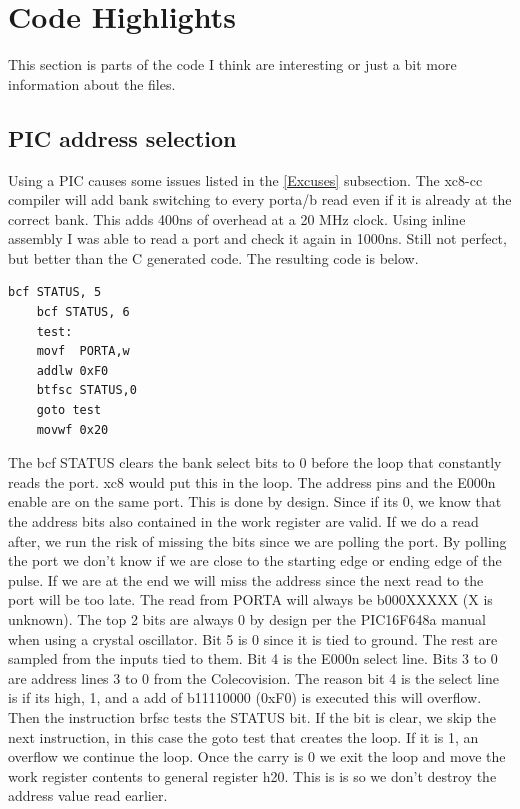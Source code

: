 \documentclass{article}
\begin{document}
  \newpage

  \section{Code Highlights}

  \par
  This section is parts of the code I think are interesting or just a bit more information about the files.

  \subsection{PIC address selection} \label{PIC address selection}

  \par
  Using a PIC causes some issues listed in the \ref{Excuses} subsection. The xc8-cc compiler will add bank switching to every porta/b read even if
  it is already at the correct bank. This adds 400ns of overhead at a 20 MHz clock. Using inline assembly I was able to read a port and check it again
  in 1000ns. Still not perfect, but better than the C generated code. The resulting code is below.

  \begin{lstlisting}[language={[xc8]Assembler}]
    bcf STATUS, 5
    bcf STATUS, 6
    test:
    movf  PORTA,w
    addlw 0xF0
    btfsc STATUS,0
    goto test
    movwf 0x20
  \end{lstlisting}

  \par
  The bcf STATUS clears the bank select bits to 0 before the loop that constantly reads the port. xc8 would put this in the loop.
  The address pins and the E000n enable are on the same port. This is done by design. Since if its 0, we know that the address bits
  also contained in the work register are valid. If we do a read after, we run the risk of missing the bits since we are polling the port.
  By polling the port we don't know if we are close to the starting edge or ending edge of the pulse. If we are at the end we will miss the
  address since the next read to the port will be too late. The read from PORTA will always be b000XXXXX (X is unknown). The top 2 bits
  are always 0 by design per the PIC16F648a manual when using a crystal oscillator. Bit 5 is 0 since it is tied to ground. The rest are sampled
  from the inputs tied to them. Bit 4 is the E000n select line. Bits 3 to 0 are address lines 3 to 0 from the Colecovision. The reason bit 4 is
  the select line is if its high, 1, and a add of b11110000 (0xF0) is executed this will overflow. Then the instruction brfsc tests the STATUS bit.
  If the bit is clear, we skip the next instruction, in this case the goto test that creates the loop. If it is 1, an overflow we continue the
  loop. Once the carry is 0 we exit the loop and move the work register contents to general register h20. This is is so we don't destroy the
  address value read earlier.
\end{document}
